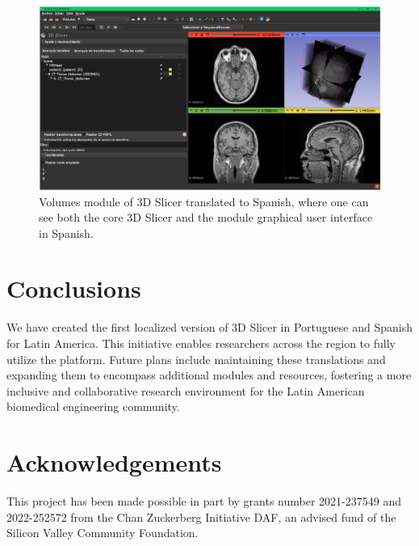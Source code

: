 \documentclass[nouppercase]{ifmbe}
\begin{document}
\begin{figure}[ht]
      \centering
          \includegraphics[width=1\columnwidth]{figures/3DSlicer_Spanish.png}
      \caption{Volumes module of 3D Slicer translated to Spanish, where one can see both the core 3D Slicer and the module graphical user interface in Spanish.}
      \label{fig:spanish}
\end{figure}

\section{Conclusions}

We have created the first localized version of 3D Slicer in Portuguese and Spanish for Latin America. This initiative enables researchers across the region to fully utilize the platform. Future plans include maintaining these translations and expanding them to encompass additional modules and resources, fostering a more inclusive and collaborative research environment for the Latin American biomedical engineering community.

\section*{Acknowledgements}

This project has been made possible in part by grants number 2021-237549 and 2022-252572 from the Chan Zuckerberg Initiative DAF, an advised fund of the Silicon Valley Community Foundation.


\end{document}
